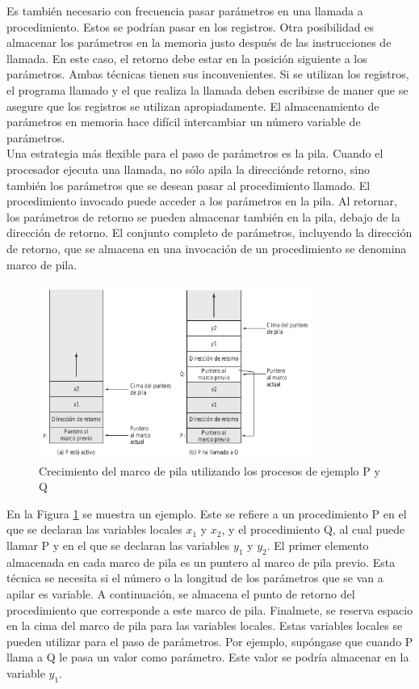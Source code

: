 \documentclass{article}
\begin{document}
							Es también necesario con frecuencia pasar parámetros en una llamada a procedimiento. Estos se podrían pasar en los registros. Otra posibilidad es almacenar los parámetros en la memoria justo después de las instrucciones de llamada. En este caso, el retorno debe estar en la posición siguiente a los parámetros. Ambas técnicas tienen sus inconvenientes. Si se utilizan los registros, el programa llamado y el que realiza la llamada deben escribirse de maner que se asegure que los registros se utilizan apropiadamente. El almacenamiento de parámetros en memoria hace difícil intercambiar un número variable de parámetros. \\
							
							Una estrategia más flexible para el paso de parámetros es la pila. Cuando el procesador ejecuta una llamada, no sólo apila la direcciónde retorno, sino también los parámetros que se desean pasar al procedimiento llamado. El procedimiento invocado puede acceder a los parámetros en la pila. Al retornar, los parámetros de retorno se pueden almacenar también en la pila, debajo de la dirección de retorno. El conjunto completo de parámetros, incluyendo la dirección de retorno, que se almacena en una invocación de un procedimiento se denomina marco de pila. \\
							
							\begin{figure}
							\caption{Crecimiento del marco de pila utilizando los procesos de ejemplo P y Q}
							\label{figura13:ejemplopil}
							\centering
							\includegraphics[width=0.8\textwidth, scale=1]{figura13.png}
							\end{figure}
							
							En la Figura \ref{figura13:ejemplopil} se muestra un ejemplo. Este se refiere a un procedimiento P en el que se declaran las variables locales $x_1$ y $x_2$, y el procedimiento Q, al cual puede llamar P y en el que se declaran las variables $y_1$ y $y_2$. El primer elemento almacenada en cada marco de pila es un puntero al marco de pila previo. Esta técnica se necesita si el número o la longitud de los parámetros que se van a apilar es variable. A continuación, se almacena el punto de retorno del procedimiento que corresponde a este marco de pila. Finalmete, se reserva espacio en la cima del marco de pila para las variables locales. Estas variables locales se pueden utilizar para el paso de parámetros. Por ejemplo, supóngase que cuando P llama a Q le pasa un valor como parámetro. Este valor se podría almacenar en la variable $y_1$. \\
							
\end{document}
